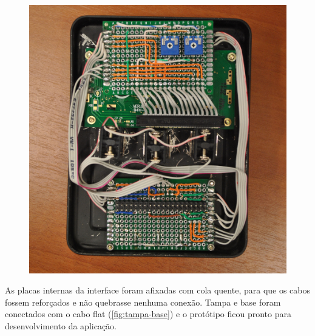 \documentclass[
		12pt,				%
		openright,			%
		oneside,			%
		a4paper,			%
		chapter=TITLE,		%
		english,			%
		brazil				%
	]{abntex2}
\begin{document}
\begin{figure}[htb]
\begin{minipage}{0.45\textwidth}
		\includegraphics[width=1\textwidth]{img/interface-traz2.jpg}
	\end{minipage}
\end{figure}

As placas internas da interface foram afixadas com cola quente, para que os cabos fossem reforçados e não quebrasse nenhuma conexão. Tampa e base foram conectados com o cabo flat (\autoref{fig:tampa-base}) e o protótipo ficou pronto para desenvolvimento da aplicação.
\end{document}
